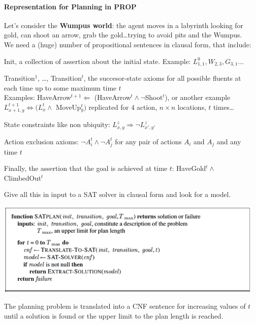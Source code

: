 \documentclass[10pt]{report}
\begin{document}
\paragraph{Representation for Planning in PROP} Let's consider the \textbf{Wumpus world}: the agent moves in a labyrinth looking for gold, can shoot an arrow, grab the gold\ldots trying to avoid pits and the Wumpus. We need a (huge) number of propositional sentences in clausal form, that include:
\begin{list}{}{}
	\item Init, a collection of assertion about the initial state. Example: $L_{1,1}^0, W_{2,3}, G_{3,1}\ldots$
	\item Transition$^1$, \ldots, Transition$^t$, the succesor-state axioms for all possible fluents at each time up to some maximum time $t$\\
	Examples: HaveArrow$^{t+1}\Leftarrow$ (HaveArrow$^t\wedge\neg$Shoot$^t$), or another example $L_{x+1,y}^{t+1}\Leftrightarrow (L_x^t\wedge$ MoveUp$_y^t)$ replicated for $4$ action, $n\times n$ locations, $t$ times\ldots
	\item State constraints like non ubiquity: $L_{x,y}^z\Rightarrow\neg L_{x',y'}^z$
	\item Action exclusion axioms: $\neg A_i^t\wedge\neg A_j^t$ for any pair of actions $A_i$ and $A_j$ and any time $t$
	\item Finally, the assertion that the goal is achieved at time $t$: HaveGold$^t\wedge$ ClimbedOut$^t$
\end{list}
Give all this in input to a SAT solver in clausal form and look for a model.
\begin{center}
	\includegraphics[scale=0.65]{22.png}
\end{center}
The planning problem is translated into a CNF sentence for increasing values of $t$ until a solution is found or the upper limit to the plan length is reached.
\end{document}
